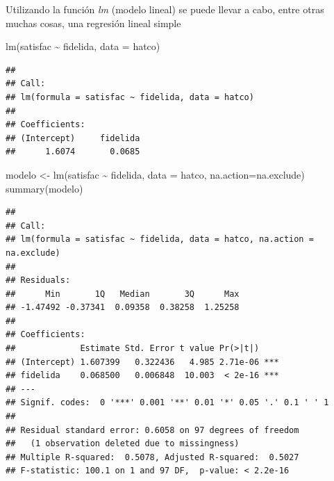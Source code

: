 \documentclass[
]{book}
\newenvironment{Shaded}{\begin{snugshade}}{\end{snugshade}}
\newcommand{\AttributeTok}[1]{\textcolor[rgb]{0.77,0.63,0.00}{#1}}
\newcommand{\CommentTok}[1]{\textcolor[rgb]{0.56,0.35,0.01}{\textit{#1}}}
\newcommand{\FunctionTok}[1]{\textcolor[rgb]{0.00,0.00,0.00}{#1}}
\newcommand{\NormalTok}[1]{#1}
\newcommand{\OtherTok}[1]{\textcolor[rgb]{0.56,0.35,0.01}{#1}}
\newcommand{\SpecialCharTok}[1]{\textcolor[rgb]{0.00,0.00,0.00}{#1}}
\theoremstyle{break}
\theoremstyle{nonumberplain}
\begin{document}
Utilizando la función \emph{lm} (modelo lineal) se puede llevar a cabo, entre otras
muchas cosas, una regresión lineal simple

\begin{Shaded}
\begin{Highlighting}[]
\FunctionTok{lm}\NormalTok{(satisfac }\SpecialCharTok{\textasciitilde{}}\NormalTok{ fidelida, }\AttributeTok{data =}\NormalTok{ hatco)}
\end{Highlighting}
\end{Shaded}

\begin{verbatim}
## 
## Call:
## lm(formula = satisfac ~ fidelida, data = hatco)
## 
## Coefficients:
## (Intercept)     fidelida  
##      1.6074       0.0685
\end{verbatim}

\begin{Shaded}
\begin{Highlighting}[]
\NormalTok{modelo }\OtherTok{\textless{}{-}} \FunctionTok{lm}\NormalTok{(satisfac }\SpecialCharTok{\textasciitilde{}}\NormalTok{ fidelida, }\AttributeTok{data =}\NormalTok{ hatco, }\AttributeTok{na.action=}\NormalTok{na.exclude)}
\FunctionTok{summary}\NormalTok{(modelo)}
\end{Highlighting}
\end{Shaded}

\begin{verbatim}
## 
## Call:
## lm(formula = satisfac ~ fidelida, data = hatco, na.action = na.exclude)
## 
## Residuals:
##      Min       1Q   Median       3Q      Max 
## -1.47492 -0.37341  0.09358  0.38258  1.25258 
## 
## Coefficients:
##             Estimate Std. Error t value Pr(>|t|)    
## (Intercept) 1.607399   0.322436   4.985 2.71e-06 ***
## fidelida    0.068500   0.006848  10.003  < 2e-16 ***
## ---
## Signif. codes:  0 '***' 0.001 '**' 0.01 '*' 0.05 '.' 0.1 ' ' 1
## 
## Residual standard error: 0.6058 on 97 degrees of freedom
##   (1 observation deleted due to missingness)
## Multiple R-squared:  0.5078, Adjusted R-squared:  0.5027 
## F-statistic: 100.1 on 1 and 97 DF,  p-value: < 2.2e-16
\end{verbatim}

\begin{Shaded}
\end{Shaded}
\end{document}

